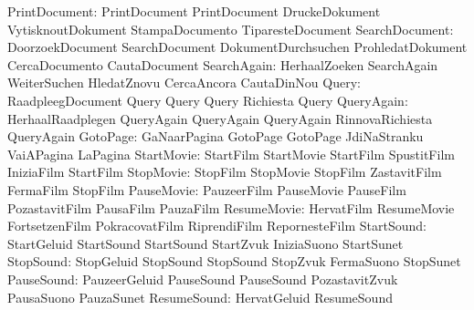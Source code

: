             PrintDocument: PrintDocument             PrintDocument
                           DruckeDokument            VytisknoutDokument
                           StampaDocumento           TiparesteDocument
           SearchDocument: DoorzoekDocument          SearchDocument
                           DokumentDurchsuchen       ProhledatDokument
                           CercaDocumento            CautaDocument
              SearchAgain: HerhaalZoeken             SearchAgain
                           WeiterSuchen              HledatZnovu
                           CercaAncora               CautaDinNou
                    Query: RaadpleegDocument         Query
                           Query                     Query
                           Richiesta                 Query %
               QueryAgain: HerhaalRaadplegen         QueryAgain
                           QueryAgain                QueryAgain
                           RinnovaRichiesta          QueryAgain %
                 GotoPage: GaNaarPagina              GotoPage
                           GotoPage                  JdiNaStranku
                           VaiAPagina                LaPagina %
               StartMovie: StartFilm                 StartMovie
                           StartFilm                 SpustitFilm
                           IniziaFilm                StartFilm
                StopMovie: StopFilm                  StopMovie
                           StopFilm                  ZastavitFilm
                           FermaFilm                 StopFilm
               PauseMovie: PauzeerFilm               PauseMovie
                           PauseFilm                 PozastavitFilm
                           PausaFilm                 PauzaFilm
              ResumeMovie: HervatFilm                ResumeMovie
                           FortsetzenFilm            PokracovatFilm
                           RiprendiFilm              RepornesteFilm
               StartSound: StartGeluid               StartSound
                           StartSound                StartZvuk
                           IniziaSuono               StartSunet %
                StopSound: StopGeluid                StopSound
                           StopSound                 StopZvuk
                           FermaSuono                StopSunet %
               PauseSound: PauzeerGeluid             PauseSound
                           PauseSound                PozastavitZvuk
                           PausaSuono                PauzaSunet %
              ResumeSound: HervatGeluid              ResumeSound
